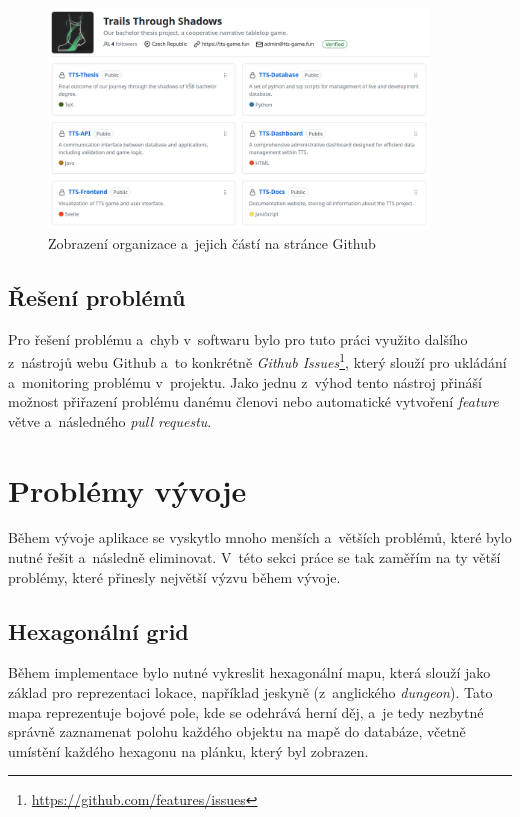 \begin{figure}[H]
    \centering
    \includegraphics[width=0.9\textwidth]{../../shared/figures/gitOrg}
    \caption{Zobrazení organizace a~jejich částí na stránce Github}
    \label{fig:git_organization}
\end{figure}

\subsection{Řešení problémů}
\label{subsec:implementation-collaboration-problems}
Pro řešení problému a~chyb v~softwaru bylo pro tuto práci využito dalšího z~nástrojů webu Github a~to konkrétně \textit{Github Issues}\footnote{\href{https://github.com/features/issues}{https://github.com/features/issues}}, který slouží pro ukládání a~monitoring problému v~projektu. Jako jednu z~výhod tento nástroj přináší možnost přiřazení problému danému členovi nebo automatické vytvoření \textit{feature} větve a~následného \textit{pull requestu}.

\section{Problémy vývoje}
\label{sec:implementation-problems}
Během vývoje aplikace se vyskytlo mnoho menších a~větších problémů, které bylo nutné řešit a~následně eliminovat. V~této sekci práce se tak zaměřím na ty větší problémy, které přinesly největší výzvu během vývoje.

\subsection*{Hexagonální grid}
\label{subsec:implementation-problems-hexagon}
Během implementace bylo nutné vykreslit hexagonální mapu, která slouží jako základ pro reprezentaci lokace, například jeskyně (z~anglického \textit{dungeon}). Tato mapa reprezentuje bojové pole, kde se odehrává herní děj, a~je tedy nezbytné správně zaznamenat polohu každého objektu na mapě do databáze, včetně umístění každého hexagonu na plánku, který byl zobrazen.

